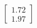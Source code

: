 \documentclass[preview]{standalone}
\begin{document}
\begin{align*}
\begin{bmatrix} 1.72 \\ 1.97 \end{bmatrix}
\end{align*}
\end{document}

